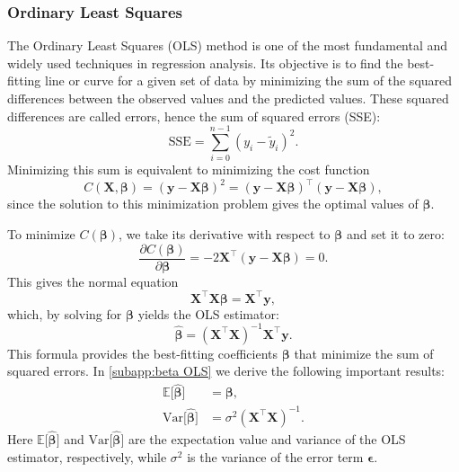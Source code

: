 \documentclass[aps,pra,english,notitlepage,reprint,nofootinbib]{revtex4-1}  %
\begin{document}
\subsubsection{Ordinary Least Squares}\label{subsubsec:ols}
The Ordinary Least Squares (OLS) method is one of the most fundamental and widely used techniques in regression analysis. Its objective is to find the best-fitting line or curve for a given set of data by minimizing the sum of the squared differences between the observed values and the predicted values. These squared differences are called errors, hence the sum of squared errors (SSE):
\begin{equation}
\text{SSE} = \sum_{i=0}^{n-1} \left( y_i - \tilde{y}_i \right)^2.
\end{equation}
Minimizing this sum is equivalent to minimizing the cost function
\begin{equation}
C(\mathbf{X},\boldsymbol{\beta}) = \left(\mathbf{y}-\mathbf{X}\boldsymbol{\beta} \right)^2 = (\mathbf{y} - \mathbf{X} \boldsymbol{\beta})^\top (\mathbf{y} - \mathbf{X} \boldsymbol{\beta}), \label{eq:OLS cost}
\end{equation}
since the solution to this minimization problem gives the optimal values of $\boldsymbol{\beta}$.

To minimize $C(\boldsymbol{\beta})$, we take its derivative with respect to $\boldsymbol{\beta}$ and set it to zero:
\begin{equation}
\frac{\partial C(\boldsymbol{\beta})}{\partial \boldsymbol{\beta}} = -2 \mathbf{X}^\top (\mathbf{y} - \mathbf{X} \boldsymbol{\beta}) = 0.
\end{equation}
This gives the normal equation
\begin{equation}
\mathbf{X}^\top \mathbf{X} \boldsymbol{\beta} = \mathbf{X}^\top \mathbf{y},
\end{equation}
which, by solving for $\boldsymbol{\beta}$ yields the OLS estimator:
\begin{equation}
\boldsymbol{\hat{\beta}} = (\mathbf{X}^\top \mathbf{X})^{-1} \mathbf{X}^\top \mathbf{y}.
\end{equation}
This formula provides the best-fitting coefficients $\boldsymbol{\beta}$ that minimize the sum of squared errors. In \cref{subapp:beta OLS} we derive the following important results:
\begin{align}
  \mathbb{E}\big[\hat{\boldsymbol{\beta}}\big] &= \boldsymbol{\beta},
  \\
  \text{Var}\big[\hat{\boldsymbol{\beta}}\big] &= \sigma^2\left(\mathbf{X}^\top\mathbf{X}\right)^{-1}.
\end{align}
Here $\mathbb{E}\big[\hat{\boldsymbol{\beta}}\big]$ and $\text{Var}\big[\hat{\boldsymbol{\beta}}\big]$ are the expectation value and variance of the OLS estimator, respectively, while $\sigma^2$ is the variance of the error term $\boldsymbol{\epsilon}$. 
\end{document}
